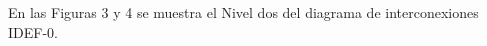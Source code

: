 En las Figuras 3 y 4 se muestra el Nivel dos del diagrama de interconexiones IDEF-0.
\newline\newline\newline\newline\newline\newline\newline\newline\newline\newline\newline
\newline\newline\newline\newline\newline\newline\newline\newline\newline\newline\newline
\newline\newline\newline\newline\newline\newline\newline\newline\newline\newline\newline
\newline\newline\newline\newline\newline\newline\newline\newline\newline\newline\newline
\newline\newline\newline\newline\newline\newline\newline\newline\newline\newline\newline
\newline\newline\newline\newline\newline\newline\newline\newline\newline\newline\newline


